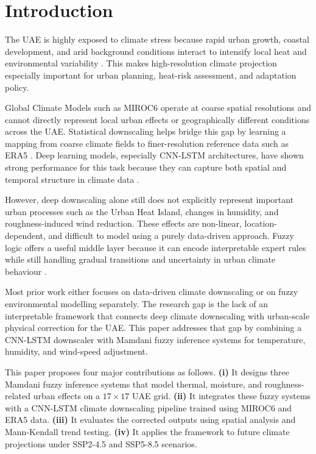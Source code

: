 \documentclass[conference]{IEEEtran}
\begin{document}

\section{Introduction}
\label{sec:intro}

The UAE is highly exposed to climate stress because rapid urban growth, coastal development, and arid background conditions interact to intensify local heat and environmental variability \cite{almazroui2020warming,radhi2013uae}. This makes high-resolution climate projection especially important for urban planning, heat-risk assessment, and adaptation policy.

Global Climate Models such as MIROC6 \cite{tatebe2019description} operate at coarse spatial resolutions and cannot directly represent local urban effects or geographically different conditions across the UAE. Statistical downscaling helps bridge this gap by learning a mapping from coarse climate fields to finer-resolution reference data such as ERA5 \cite{hersbach2020era5,maraun2018statistical}. Deep learning models, especially CNN-LSTM architectures, have shown strong performance for this task because they can capture both spatial and temporal structure in climate data \cite{shi2015convolutional,pan2019improving,vandal2017deepsd}.

However, deep downscaling alone still does not explicitly represent important urban processes such as the Urban Heat Island, changes in humidity, and roughness-induced wind reduction. These effects are non-linear, location-dependent, and difficult to model using a purely data-driven approach. Fuzzy logic offers a useful middle layer because it can encode interpretable expert rules while still handling gradual transitions and uncertainty in urban climate behaviour \cite{mamdani1975experiment,zadeh1965fuzzy,ross2010fuzzy,pedrycz2007fuzzy}.

Most prior work either focuses on data-driven climate downscaling or on fuzzy environmental modelling separately. The research gap is the lack of an interpretable framework that connects deep climate downscaling with urban-scale physical correction for the UAE. This paper addresses that gap by combining a CNN-LSTM downscaler with Mamdani fuzzy inference systems for temperature, humidity, and wind-speed adjustment.

This paper proposes four major contributions as follows. \textbf{(i)} It designs three Mamdani fuzzy inference systems that model thermal, moisture, and roughness-related urban effects on a \(17\times17\) UAE grid. \textbf{(ii)} It integrates these fuzzy systems with a CNN-LSTM climate downscaling pipeline trained using MIROC6 and ERA5 data. \textbf{(iii)} It evaluates the corrected outputs using spatial analysis and Mann-Kendall trend testing. \textbf{(iv)} It applies the framework to future climate projections under SSP2-4.5 and SSP5-8.5 scenarios.
\end{document}
